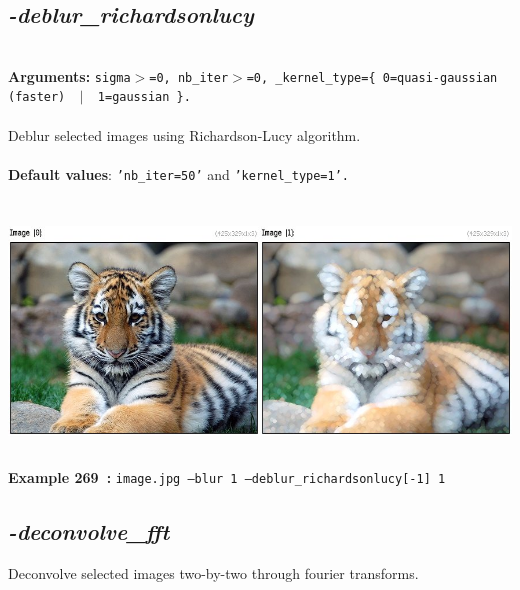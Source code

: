 \documentclass[a4paper,11pt,twoside]{book}
\begin{document}
\subsection{\emph{-deblur\_richardsonlucy} }\vspace*{-0.5em}
~\\\textbf{Arguments: } 
{\small \texttt{sigma$>$=0, nb\_iter$>$=0, \_kernel\_type=\{ 0=quasi-gaussian (faster) ~$|$~ 1=gaussian \}.}}\\~\\
Deblur selected images using Richardson-Lucy algorithm.
~\\~\\\textbf{Default values}: {\small \texttt{'nb\_iter=50'} and \texttt{'kernel\_type=1'.}}
\begin{center}\includegraphics[keepaspectratio=true,height=7cm,width=\textwidth]{img/gmic_def269.jpg}\\
{\footnotesize \textbf{Example 269~:} \texttt{image.jpg --blur 1 --deblur\_richardsonlucy[-1] 1}}
\end{center}

\subsection{\emph{-deconvolve\_fft} }\vspace*{-0.5em}
Deconvolve selected images two-by-two through fourier transforms.
\end{document}
